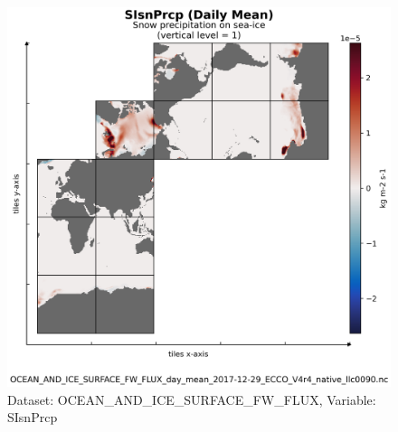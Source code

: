 \begin{figure}[H]
\centering
\includegraphics[scale=0.55]{../images/plots/v4r4/native_plots/Ocean_and_Sea-Ice_Surface_Freshwater_Fluxes/SIsnPrcp.png}
\caption{Dataset: OCEAN\_AND\_ICE\_SURFACE\_FW\_FLUX, Variable: SIsnPrcp}
\label{tab:table-OCEAN_AND_ICE_SURFACE_FW_FLUX_SIsnPrcp-Plot}
\end{figure}
\newpage
\pagebreak
